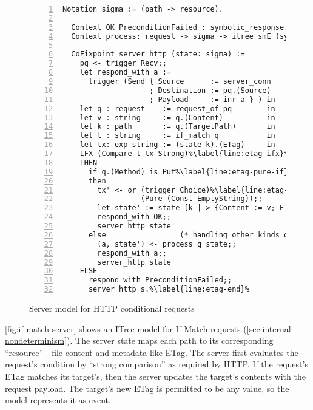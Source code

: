 \begin{figure}
\begin{lstlisting}[numbers=left]
  Notation sigma := (path -> resource).

  Context OK PreconditionFailed : symbolic_response.
  Context process: request -> sigma -> itree smE (symbolic_response * sigma).

  CoFixpoint server_http (state: sigma) :=
    pq <- trigger Recv;;
    let respond_with a :=
      trigger (Send { Source      := server_conn
                    ; Destination := pq.(Source)
                    ; Payload     := inr a } ) in
    let q : request    := request_of pq        in
    let v : string     := q.(Content)          in
    let k : path       := q.(TargetPath)       in
    let t : string     := if_match q           in
    let tx: exp string := (state k).(ETag)     in
    IFX (Compare t tx Strong)%\label{line:etag-ifx}%
    THEN
      if q.(Method) is Put%\label{line:etag-pure-if}%
      then
        tx' <- or (trigger Choice)%\label{line:etag-choice}%
                  (Pure (Const EmptyString));;
        let state' := state [k |-> {Content := v; ETag := tx'}] in
        respond_with OK;;
        server_http state'
      else                 (* handling other kinds of requests *)
        (a, state') <- process q state;;
        respond_with a;;
        server_http state'
    ELSE
      respond_with PreconditionFailed;;
      server_http s.%\label{line:etag-end}%
\end{lstlisting}
\caption{Server model for HTTP conditional requests}
\label{fig:if-match-server}
\end{figure}

\autoref{fig:if-match-server} shows an ITree model for If-Match requests 
(\autoref{sec:internal-nondeterminism}).  The server state    maps each path to its corresponding ``resource''---file content and
metadata like ETag.  The server first evaluates the request's 
condition by ``strong comparison'' as required by HTTP.  If the request's ETag
matches its target's, then the server updates the target's contents with the
request payload.  The target's new ETag  is permitted to be any value,
so the model represents it as  event.

